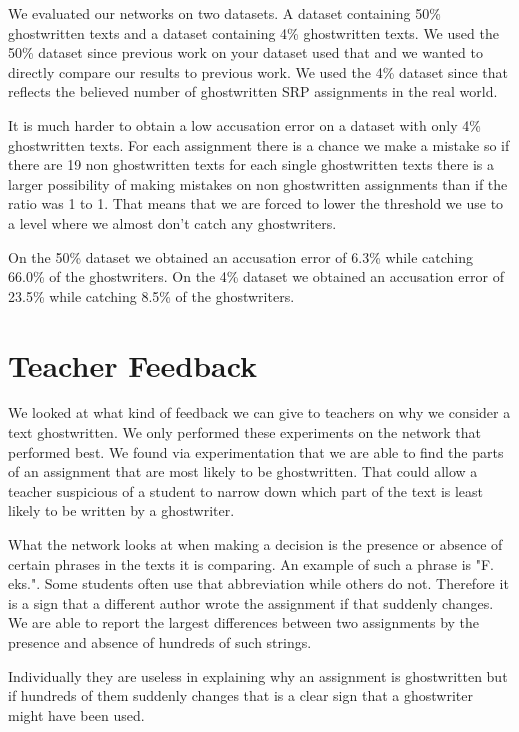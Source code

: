 \documentclass[11pt]{article}
\begin{document}
    We evaluated our networks on two datasets. A dataset containing 50\%
    ghostwritten texts and a dataset containing 4\% ghostwritten texts. We used
    the 50\% dataset since previous work on your dataset used that and we wanted
    to directly compare our results to previous work. We used the 4\% dataset
    since that reflects the believed number of ghostwritten SRP assignments in
    the real world.

    It is much harder to obtain a low accusation error on a dataset with
    only 4\% ghostwritten texts. For each assignment there is a chance we
    make a mistake so if there are 19 non ghostwritten texts for each single
    ghostwritten texts there is a larger possibility of making mistakes on non
    ghostwritten assignments than if the ratio was 1 to 1. That means that we
    are forced to lower the threshold we use to a level where we almost don't
    catch any ghostwriters.

    On the 50\% dataset we obtained an accusation error of 6.3\% while catching
    66.0\% of the ghostwriters. On the 4\% dataset we obtained an accusation
    error of 23.5\% while catching 8.5\% of the ghostwriters.


    \section{Teacher Feedback}

    We looked at what kind of feedback we can give to teachers on why we
    consider a text ghostwritten. We only performed these experiments on the
    network that performed best. We found via experimentation that we are able
    to find the parts of an assignment that are most likely to be ghostwritten.
    That could allow a teacher suspicious of a student to narrow down which part
    of the text is least likely to be written by a ghostwriter.

    What the network looks at when making a decision is the presence or absence
    of certain phrases in the texts it is comparing. An example of such a phrase
    is "F. eks.". Some students often use that abbreviation while others do not.
    Therefore it is a sign that a different author wrote the assignment if that
    suddenly changes. We are able to report the largest differences between two
    assignments by the presence and absence of hundreds of such strings.

    Individually they are useless in explaining why an assignment is
    ghostwritten but if hundreds of them suddenly changes that is a clear sign
    that a ghostwriter might have been used.
\end{document}
